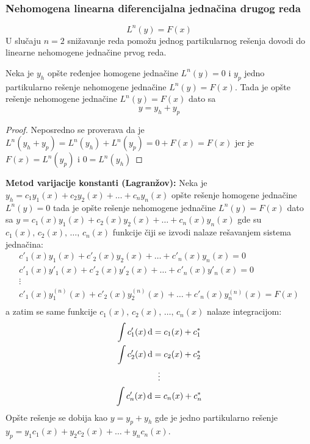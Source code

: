 \subsubsection{Nehomogena linearna diferencijalna jednačina drugog reda}
$$ L^n(y) = F(x) $$
U slučaju $n = 2$ snižavanje reda pomožu jednog partikularnog rešenja dovodi do linearne nehomogene jednačine prvog reda.
\begin{theorem}
	Neka je $y_h$ opšte ređenjee homogene jednačine $L^n(y) = 0$ i $y_p$ jedno partikularno rešenje nehomogene jednačine $L^n(y) = F(x)$. Tada je opšte rešenje nehomogene jednačine $L^n(y)=F(x)$ dato sa 
	$$y = y_h + y_p$$
\end{theorem}
\begin{proof}
	Neposredno se proverava da je $L^n(y_h + y_p) = L^n(y_h) + L^n(y_p) = 0 + F(x) = F(x)$ jer je $F(x) = L^n(y_p)$ i $0 = L^n(y_h)$
\end{proof}
\begin{theorem}
	\textbf{Metod varijacije konstanti (Lagranžov):} Neka je $y_h = c_1 y_1(x) + c_2 y_2(x) + \ldots + c_n y_n(x)$ opšte rešenje homogene jednačine $L^n(y) = 0$ tada je opšte rešenje nehomogene jednačine $L^n(y) = F(x)$ dato sa $y = c_1(x) y_1(x) + c_2(x) y_2(x) + \ldots + c_n (x) y_n(x)$ gde su $c_1(x), \, c_2(x), \, \ldots, \, c_n(x)$ funkcije čiji se izvodi nalaze rešavanjem sistema jednačina:
	\begin{gather*}
		c'_1(x) y_1(x) + c'_2(x) y_2(x) + \ldots + c'_n (x) y_n(x) = 0\\
		c'_1(x) y'_1(x) + c'_2(x) y'_2(x) + \ldots + c'_n (x) y'_n(x) = 0\\
		\vdots\\
		c'_1(x) y_1^{(n)}(x) + c'_2(x) y^{(n)}_2(x) + \ldots + c'_n (x) y^{(n)}_n(x) = F(x)\\
	\end{gather*}
	a zatim se same funkcije $c_1(x), \, c_2(x), \, \ldots, \, c_n(x)$ nalaze integracijom:
	\begin{gather*}
		\int c'_1(x) \, \mathrm{d} = c_1(x) + c^*_1\\
		\int c'_2(x) \, \mathrm{d} = c_2(x) + c^*_2\\
		\vdots\\
		\int c'_n(x) \, \mathrm{d} = c_n(x) + c^*_n\\
	\end{gather*}
	Opšte rešenje se dobija kao $y = y_p + y_h$ gde je jedno partikularno rešenje  $y_p = y_1 c_1(x) + y_2 c_2 (x) + \ldots + y_n c_n (x)$.
\end{theorem}

